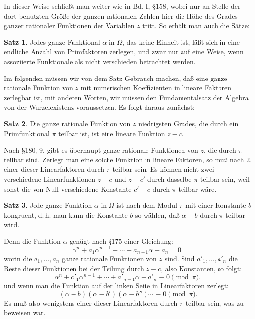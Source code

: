 \documentclass[12pt,a4paper]{article}
\theoremstyle{definition}
\newtheorem{satz}{Satz}[section]
\begin{document}
In dieser Weise schließt man weiter wie in Bd. I, \S 158, wobei nur an Stelle der dort benutzten Größe der ganzen rationalen Zahlen hier die Höhe des Grades ganzer rationaler Funktionen der Variablen $z$ tritt. So erhält man auch die Sätze:

\begin{satz}
Jedes ganze Funktional $\alpha$ in $\Omega$, das keine Einheit ist, läßt sich in eine endliche Anzahl von Primfaktoren zerlegen, und zwar nur auf eine Weise, wenn assoziierte Funktionale als nicht verschieden betrachtet werden.
\end{satz}

Im folgenden müssen wir von dem Satz Gebrauch machen, daß eine ganze rationale Funktion von $z$ mit numerischen Koeffizienten in lineare Faktoren zerlegbar ist, mit anderen Worten, wir müssen den Fundamentalsatz der Algebra von der Wurzelexistenz voraussetzen. Es folgt daraus zunächst:

\begin{satz}
Die ganze rationale Funktion von $z$ niedrigsten Grades, die durch ein Primfunktional $\pi$ teilbar ist, ist eine lineare Funktion $z - c$.
\end{satz}

Nach \S 180, 9. gibt es überhaupt ganze rationale Funktionen von $z$, die durch $\pi$ teilbar sind. Zerlegt man eine solche Funktion in lineare Faktoren, so muß nach 2. einer dieser Linearfaktoren durch $\pi$ teilbar sein. Es können nicht zwei verschiedene Linearfunktionen $z - c$ und $z - c'$ durch dasselbe $\pi$ teilbar sein, weil sonst die von Null verschiedene Konstante $c' - c$ durch $\pi$ teilbar wäre.

\begin{satz}
Jede ganze Funktion $\alpha$ in $\Omega$ ist nach dem Modul $\pi$ mit einer Konstante $b$ kongruent, d.\,h. man kann die Konstante $b$ so wählen, daß $\alpha - b$ durch $\pi$ teilbar wird.
\end{satz}

Denn die Funktion $\alpha$ genügt nach \S 175 einer Gleichung:
\[\alpha^n + a_1\alpha^{n-1} + \cdots + a_{n-1}\alpha + a_n = 0,\]
worin die $a_1, \ldots, a_n$ ganze rationale Funktionen von $z$ sind. Sind $a'_1, \ldots, a'_n$ die Reste dieser Funktionen bei der Teilung durch $z - c$, also Konstanten, so folgt:
\[\alpha^n + a'_1\alpha^{n-1} + \cdots + a'_{n-1}\alpha + a'_n \equiv 0 \pmod{\pi},\]
und wenn man die Funktion auf der linken Seite in Linearfaktoren zerlegt:
\begin{equation}
(\alpha - b)(\alpha - b')(\alpha - b'')\cdots \equiv 0 \pmod{\pi}.
\end{equation}
Es muß also wenigstens einer dieser Linearfaktoren durch $\pi$ teilbar sein, was zu beweisen war.
\end{document}

